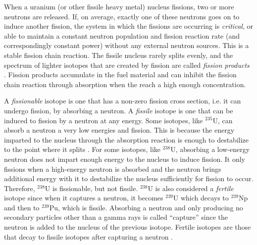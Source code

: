 When a uranium (or other fissile heavy metal) nucleus fissions, two or more neutrons are released.  If, on average, exactly one of these neutrons goes on to induce another fission, the system in which the fissions are occurring is \emph{critical}, or able to maintain a constant neutron population and fission reaction rate (and correspondingly constant power) without any external neutron sources.  This is a stable fission chain reaction.  The fissile nucleus rarely splits evenly, and the spectrum of lighter isotopes that are created by fission are called \emph{fission products} \cite{duderstadt}.  Fission products accumulate in the fuel material and can inhibit the fission chain reaction through absorption when the reach a high enough concentration.

A \emph{fissionable} isotope is one that has a non-zero fission cross section, i.e. it can undergo fission, by absorbing a neutron.  A \emph{fissile} isotope is one that can be induced to fission by a neutron at any energy.  Some isotopes, like $^{235}$U, can absorb a neutron a very low energies and fission.  This is because the energy imparted to the nucleus through the absorption reaction is enough to destabilize to the point where it splits \cite{duderstadt}.  For some isotopes, like $^{238}$U, absorbing a low-energy neutron does not impart enough energy to the nucleus to induce fission.  It only fissions when a high-energy neutron is absorbed and the neutron brings additional energy with it to destabilize the nucleus sufficiently for fission to occur.  Therefore, $^{238}$U is fissionable, but not fissile.  $^{238}$U is also considered a \emph{fertile} isotope since when it captures a neutron, it becomes $^{239}$U which decays to $^{239}$Np and then to $^{239}$Pu, which is fissile.  Absorbing a neutron and only producing no secondary particles other than a gamma rays is called ``capture'' since the neutron is added to the nucleus of the previous isotope.  Fertile isotopes are those that decay to fissile isotopes after capturing a neutron \cite{duderstadt}.

